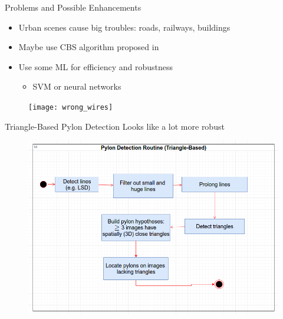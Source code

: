\documentclass{beamer}
\begin{document}
\begin{frame}[t, fragile]{Problems and Possible Enhancements}
\begin{itemize}
\item Urban scenes cause big troubles: roads, railways, buildings
\item Maybe use CBS algorithm proposed in \rbrack
\item Use some ML for efficiency and robustness
\begin{itemize} 
\item SVM or neural networks
\end{itemize}
\end{itemize}
\begin{figure}
\centering
\texttt{[image: wrong\_wires]}
\end{figure}
\end{frame}


\begin{frame}[t, fragile]{Triangle-Based Pylon Detection}
Looks like a lot more robust
\begin{figure}
\centering
\includegraphics[scale=0.3]{detect1}
\end{figure}
\end{frame}
\end{document}
